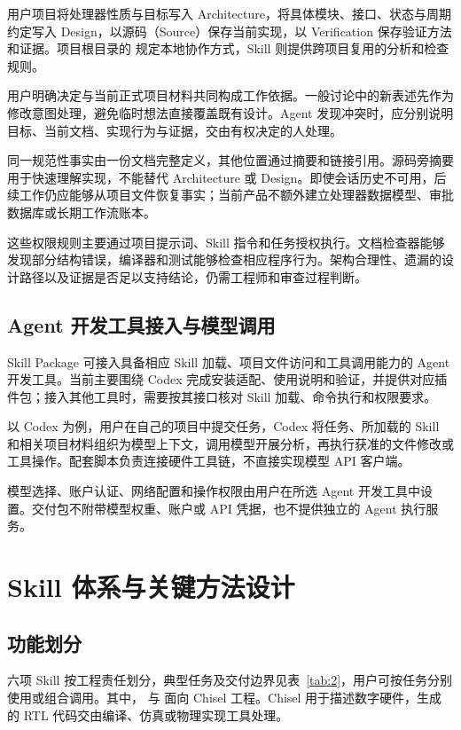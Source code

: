 \documentclass[UTF8,fontset=none,zihao=-4,a4paper]{ctexart}
\begin{document}
用户项目将处理器性质与目标写入 Architecture，将具体模块、接口、状态与周期约定写入 Design，以源码（Source）保存当前实现，以 Verification 保存验证方法和证据。项目根目录的  规定本地协作方式，Skill 则提供跨项目复用的分析和检查规则。

用户明确决定与当前正式项目材料共同构成工作依据。一般讨论中的新表述先作为修改意图处理，避免临时想法直接覆盖既有设计。Agent 发现冲突时，应分别说明目标、当前文档、实现行为与证据，交由有权决定的人处理。

同一规范性事实由一份文档完整定义，其他位置通过摘要和链接引用。源码旁摘要用于快速理解实现，不能替代 Architecture 或 Design。即使会话历史不可用，后续工作仍应能够从项目文件恢复事实；当前产品不额外建立处理器数据模型、审批数据库或长期工作流账本。

这些权限规则主要通过项目提示词、Skill 指令和任务授权执行。文档检查器能够发现部分结构错误，编译器和测试能够检查相应程序行为。架构合理性、遗漏的设计路径以及证据是否足以支持结论，仍需工程师和审查过程判断。

\subsection{Agent 开发工具接入与模型调用}

Skill Package 可接入具备相应 Skill 加载、项目文件访问和工具调用能力的 Agent 开发工具。当前主要围绕 Codex 完成安装适配、使用说明和验证，并提供对应插件包；接入其他工具时，需要按其接口核对 Skill 加载、命令执行和权限要求。

以 Codex 为例，用户在自己的项目中提交任务，Codex 将任务、所加载的 Skill 和相关项目材料组织为模型上下文，调用模型开展分析，再执行获准的文件修改或工具操作。配套脚本负责连接硬件工具链，不直接实现模型 API 客户端。

模型选择、账户认证、网络配置和操作权限由用户在所选 Agent 开发工具中设置。交付包不附带模型权重、账户或 API 凭据，也不提供独立的 Agent 执行服务。

\section{Skill 体系与关键方法设计}

\subsection{功能划分}

六项 Skill 按工程责任划分，典型任务及交付边界见表~\ref{tab:2}，用户可按任务分别使用或组合调用。其中， 与  面向 Chisel 工程。Chisel 用于描述数字硬件，生成的 RTL 代码交由编译、仿真或物理实现工具处理。
\end{document}
